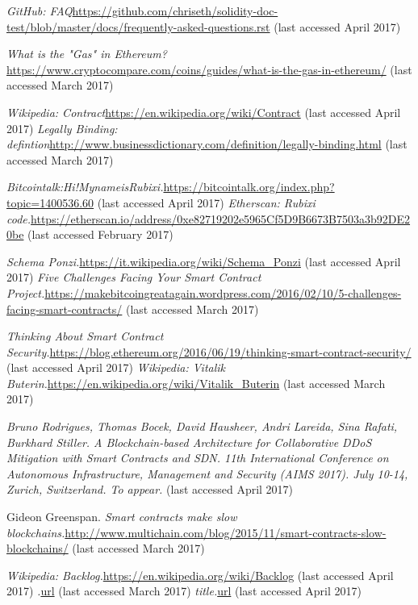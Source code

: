 \begin{thebibliography}{99}
\emph{GitHub: FAQ}\url{https://github.com/chriseth/solidity-doc-test/blob/master/docs/frequently-asked-questions.rst} (last accessed April 2017)




\emph{What is the "Gas" in Ethereum?}\url{https://www.cryptocompare.com/coins/guides/what-is-the-gas-in-ethereum/} (last accessed March 2017)

\emph{Wikipedia: Contract}\url{https://en.wikipedia.org/wiki/Contract} (last accessed April 2017)
\emph{Legally Binding: defintion}\url{http://www.businessdictionary.com/definition/legally-binding.html} (last accessed March 2017)


\emph{Bitcointalk:Hi!MynameisRubixi.}\url{https://bitcointalk.org/index.php?topic=1400536.60} (last accessed April 2017)
\emph{Etherscan: Rubixi code.}\url{https://etherscan.io/address/0xe82719202e5965Cf5D9B6673B7503a3b92DE20be} (last accessed February 2017)
    
    
\emph{Schema Ponzi.}\url{https://it.wikipedia.org/wiki/Schema_Ponzi} (last accessed April 2017)
\emph{Five Challenges Facing Your Smart Contract Project.}\url{https://makebitcoingreatagain.wordpress.com/2016/02/10/5-challenges-facing-smart-contracts/} (last accessed March 2017)

\emph{Thinking About Smart Contract Security.}\url{https://blog.ethereum.org/2016/06/19/thinking-smart-contract-security/} (last accessed April 2017)
\emph{Wikipedia: Vitalik Buterin.}\url{https://en.wikipedia.org/wiki/Vitalik_Buterin} (last accessed March 2017)


\emph{Bruno Rodrigues, Thomas Bocek, David Hausheer, Andri Lareida, Sina Rafati, Burkhard Stiller. A Blockchain-based Architecture for Collaborative DDoS Mitigation with Smart Contracts and SDN. 11th International Conference on Autonomous Infrastructure, Management and Security (AIMS 2017). July 10-14, Zurich, Switzerland. To appear.} (last accessed April 2017)

 Gideon Greenspan. \emph{Smart contracts make slow blockchains.}\url{http://www.multichain.com/blog/2015/11/smart-contracts-slow-blockchains/} (last accessed March 2017)


\emph{Wikipedia: Backlog.}\url{https://en.wikipedia.org/wiki/Backlog} (last accessed April 2017)
\emph{.}\url{url} (last accessed March 2017)
\emph{title.}\url{url} (last accessed April 2017)




\end{thebibliography}
